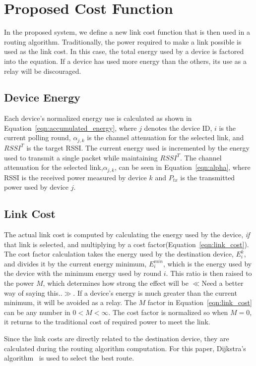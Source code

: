 \documentclass{article}
\begin{document}
\section{Proposed Cost Function}
In the proposed system, we define a new link cost function that is then used in a routing algorithm. Traditionally, the power required to make a link possible is used as the link cost. In this case, the total energy used by a device is factored into the equation. If a device has used more energy than the others, its use as a relay will be discouraged.

\subsection{Device Energy}
Each device's normalized energy use is calculated as shown in Equation~\ref{eqn:accumulated_energy}, where $j$ denotes the device ID, $i$ is the current polling round, $\alpha_{j,k}$ is the channel attenuation for the selected link, and $RSSI^T$ is the target RSSI. The current energy used is incremented by the energy used to transmit a single packet while maintaining $RSSI^T$. The channel attenuation for the selected link,$\alpha_{j,k}$, can be seen in Equation~\ref{eqn:alpha}, where RSSI is the received power measured by device $k$ and $P_{tx}$ is the transmitted power used by device $j$. 

\subsection{Link Cost}
The actual link cost is computed by calculating the energy used by the device, \emph{if} that link is selected, and multiplying by a cost factor(Equation~\ref{eqn:link_cost}). The cost factor calculation takes the energy used by the destination device, $E^k_i$, and divides it by the current energy minimum, $E^{min}_{i}$, which is the energy used by the device with the minimum energy used by round $i$. This ratio is then raised to the power $M$, which determines how strong the effect will be $\ll$Need a better way of saying this..$\gg$. If a device's energy is much greater than the current minimum, it will be avoided as a relay.
The $M$ factor in Equation~\ref{eqn:link_cost} can be any number in $0 < M < \infty$. The cost factor is normalized so when $M=0$, it returns to the traditional cost of required power to meet the link.

Since the link costs are directly related to the destination device, they are calculated during the routing algorithm computation. For this paper, Dijkstra's algorithm~\cite{dijkstra:algorithm} is used to select the best route.
\end{document}
